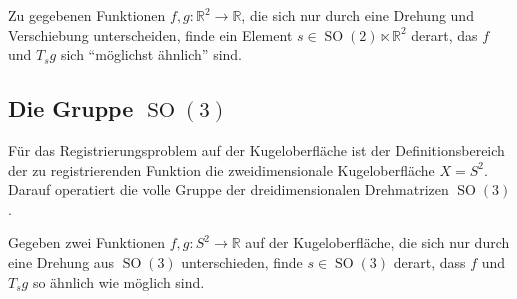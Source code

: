 \begin{aufgabe}
Zu gegebenen Funktionen $f,g\colon \mathbb{R}^2\to\mathbb{R}$, die sich
nur durch eine Drehung und Verschiebung unterscheiden, finde ein
Element $s\in\operatorname{SO}(2)\ltimes \mathbb{R}^2$ derart, das
$f$ und $T_sg$ sich ``möglichst ähnlich'' sind.
\end{aufgabe}

%
%
\subsection{Die Gruppe $\operatorname{SO}(3)$
\label{buch:nichtkomm:motivation:subsection:so3}}
Für das Registrierungsproblem auf der Kugeloberfläche ist der
Definitionsbereich der zu registrierenden Funktion die
zweidimensionale Kugeloberfläche $X=S^2$.
Darauf operatiert die volle Gruppe der dreidimensionalen
Drehmatrizen $\operatorname{SO}(3)$.

\begin{aufgabe}
Gegeben zwei Funktionen $f,g\colon S^2\to\mathbb{R}$ auf der Kugeloberfläche,
die sich nur durch eine Drehung aus $\operatorname{SO}(3)$ unterschieden,
finde $s\in\operatorname{SO}(3)$ derart, dass $f$ und $T_sg$ so ähnlich
wie möglich sind.
\end{aufgabe}





